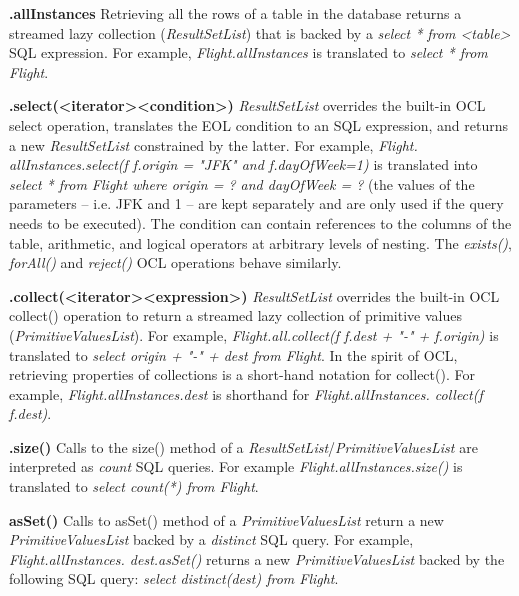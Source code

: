 \begin{description}
	\item \textbf{.allInstances} Retrieving all the rows of a table in the database returns a streamed lazy collection (\emph{ResultSetList}) that is backed by a \emph{select * from <table>} SQL expression. For example, \emph{Flight.allInstances} is translated to \emph{select * from Flight}.
	
	\item \textbf{.select(<iterator>\textbar<condition>)} \emph{ResultSetList} overrides the built-in OCL select operation, translates the EOL condition to an SQL expression, and returns a new \emph{ResultSetList} constrained by the latter. 
	For example, \emph{Flight. allInstances.select(f \textbar f.origin = "JFK" and f.dayOfWeek=1)} is translated into \emph{select * from Flight where origin = ? and dayOfWeek = ?} (the values of the parameters -- i.e. JFK and 1 -- are kept separately and are only used if the query needs to be executed). The condition can contain references to the columns of the table, arithmetic, and logical operators at arbitrary levels of nesting. The \emph{exists()}, \emph{forAll()} and \emph{reject()} OCL operations behave similarly.
	\item\textbf{.collect(<iterator>\textbar<expression>)} \emph{ResultSetList} overrides the built-in OCL collect() operation to return a streamed lazy collection of primitive values (\emph{PrimitiveValuesList}). For example, \emph{Flight.all.collect(f \textbar f.dest + "-" + f.origin)} is translated to \emph{select origin + "-" + dest from Flight}. In the spirit of OCL, retrieving properties of collections is a short-hand notation for collect(). For example, \emph{Flight.allInstances.dest} is shorthand for \emph{Flight.allInstances. collect(f \textbar f.dest)}.
	
	\item \textbf{.size()} Calls to the size() method of a \emph{ResultSetList}/\emph{PrimitiveValuesList} are interpreted as \emph{count} SQL queries. For example \emph{Flight.allInstances.size()} is translated to \emph{select count(*) from Flight}.

	\item\textbf{asSet()} Calls to asSet() method of a \emph{PrimitiveValuesList} return a new \emph{PrimitiveValuesList} backed by a \emph{distinct} SQL query. For example, \emph{Flight.allInstances. dest.asSet()} returns a new \emph{PrimitiveValuesList} backed by the following SQL query: \emph{select distinct(dest) from Flight}. 

\end{description}

